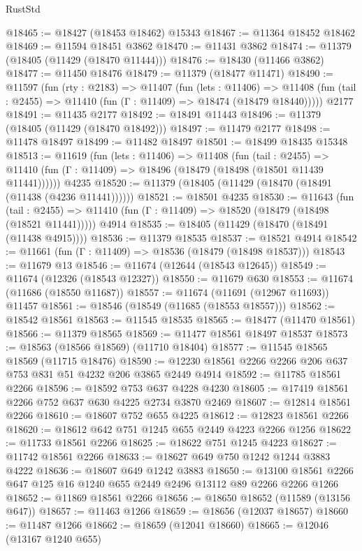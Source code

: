 \begin{lexlean}{RustStd}
\begin{coremodule}
@18465 := @18427 (@18453 @18462) @15343
@18467 := @11364 @18452 @18462
@18469 := @11594 @18451 @3862
@18470 := @11431 @3862
@18474 := @11379 (@18405 (@11429 (@18470 @11444)))
@18476 := @18430 (@11466 @3862)
@18477 := @11450 @18476
@18479 := @11379 (@18477 @11471)
@18490 := @11597
    (fun (rty : @2183) =>
    @11407
      (fun (lets : @11406) =>
      @11408 (fun (tail : @2455) => @11410 (fun (Γ : @11409) => @18474 (@18479 @18440)))))
    @2177
@18491 := @11435 @2177
@18492 := @18491 @11443
@18496 := @11379 (@18405 (@11429 (@18470 @18492)))
@18497 := @11479 @2177
@18498 := @11478 @18497
@18499 := @11482 @18497
@18501 := @18499 @18435 @15348
@18513 := @11619
    (fun (lets : @11406) =>
    @11408
      (fun (tail : @2455) =>
      @11410 (fun (Γ : @11409) => @18496 (@18479 (@18498 (@18501 @11439 @11441))))))
    @4235
@18520 := @11379 (@18405 (@11429 (@18470 (@18491 (@11438 (@4236 @11441))))))
@18521 := @18501 @4235
@18530 := @11643
    (fun (tail : @2455) => @11410 (fun (Γ : @11409) => @18520 (@18479 (@18498 (@18521 @11441)))))
    @4914
@18535 := @18405 (@11429 (@18470 (@18491 (@11438 @4915))))
@18536 := @11379 @18535
@18537 := @18521 @4914
@18542 := @11661 (fun (Γ : @11409) => @18536 (@18479 (@18498 @18537)))
@18543 := @11679 @13
@18546 := @11674 (@12644 (@18543 @12645))
@18549 := @11674 (@12326 (@18543 @12327))
@18550 := @11679 @630
@18553 := @11674 (@11686 (@18550 @11687))
@18557 := @11674 (@11691 (@12967 @11693)) @11457
@18561 := @18546 (@18549 (@11685 (@18553 @18557)))
@18562 := @18542 @18561
@18563 := @11545 @18535
@18565 := @18477 (@11470 @18561)
@18566 := @11379 @18565
@18569 := @11477 @18561 @18497 @18537
@18573 := @18563 (@18566 @18569) (@11710 @18404)
@18577 := @11545 @18565 @18569 (@11715 @18476)
@18590 := @12230 @18561 @2266 @2266 @206 @637 @753 @831 @51 @4232 @206 @3865 @2449 @4914
@18592 := @11785 @18561 @2266
@18596 := @18592 @753 @637 @4228 @4230
@18605 := @17419 @18561 @2266 @752 @637 @630 @4225 @2734 @3870 @2469
@18607 := @12814 @18561 @2266
@18610 := @18607 @752 @655 @4225
@18612 := @12823 @18561 @2266
@18620 := @18612 @642 @751 @1245 @655 @2449 @4223 @2266 @1256
@18622 := @11733 @18561 @2266
@18625 := @18622 @751 @1245 @4223
@18627 := @11742 @18561 @2266
@18633 := @18627 @649 @750 @1242 @1244 @3883 @4222
@18636 := @18607 @649 @1242 @3883
@18650 := @13100 @18561 @2266 @647 @125 @16 @1240 @655 @2449 @2496 @13112 @89 @2266 @2266 @1266
@18652 := @11869 @18561 @2266
@18656 := @18650 @18652 (@11589 (@13156 @647))
@18657 := @11463 @1266
@18659 := @18656 (@12037 @18657)
@18660 := @11487 @1266
@18662 := @18659 (@12041 @18660)
@18665 := @12046 (@13167 @1240 @655)

\end{coremodule}
\end{lexlean}
